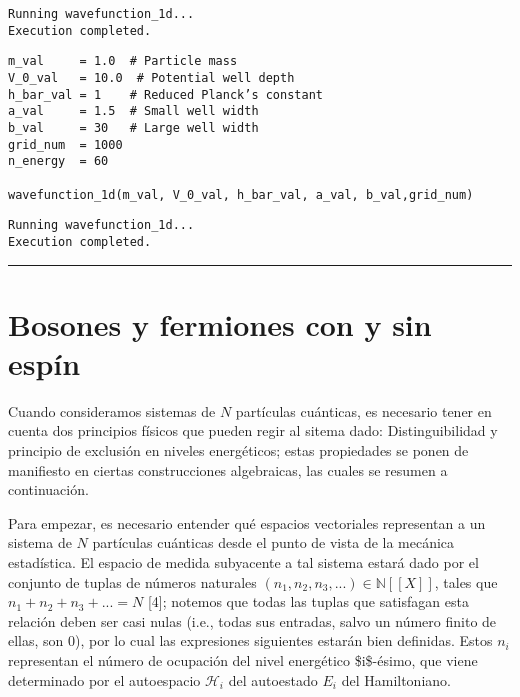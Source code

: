 \documentclass[11pt]{article}
\begin{document}
\label{orgbdcb23c}
\begin{verbatim}
Running wavefunction_1d...
Execution completed.
\end{verbatim}

\begin{center}

\end{center}
\begin{center}

\end{center}

\begin{verbatim}
m_val     = 1.0  # Particle mass
V_0_val   = 10.0  # Potential well depth
h_bar_val = 1    # Reduced Planck’s constant
a_val     = 1.5  # Small well width
b_val     = 30   # Large well width
grid_num  = 1000
n_energy  = 60

wavefunction_1d(m_val, V_0_val, h_bar_val, a_val, b_val,grid_num)
\end{verbatim}

\label{org7ef58a2}
\begin{verbatim}
Running wavefunction_1d...
Execution completed.
\end{verbatim}

\begin{center}

\end{center}
\begin{center}

\end{center}

\noindent\rule{\textwidth}{0.5pt}
\section{Bosones y fermiones con y sin espín}
\label{sec:orgb01af17}

Cuando consideramos sistemas de \(N\) partículas cuánticas, es necesario tener
en cuenta dos principios físicos que pueden regir al sitema dado:
Distinguibilidad y principio de exclusión en niveles energéticos; estas
propiedades se ponen de manifiesto en ciertas construcciones algebraicas, las
cuales se resumen a continuación.

Para empezar, es necesario entender qué espacios vectoriales representan a un
sistema de \(N\) partículas cuánticas desde el punto de vista de la mecánica
estadística. El espacio de medida subyacente a tal sistema estará dado por el
conjunto de tuplas de números naturales \((n_1, n_2, n_3, ...) \in
\mathbb{N}[\![X]\!]\), tales que \(n_1 + n_2 + n_3 + ... = N\) {[}4];
notemos que todas las tuplas que satisfagan esta relación deben ser casi nulas (i.e., todas
sus entradas, salvo un número finito de ellas, son 0), por lo cual las
expresiones siguientes estarán bien definidas. Estos \(n_i\) representan el
número de ocupación del nivel energético \$i\$-ésimo, que viene determinado por
el autoespacio \(\mathcal{H}_i\) del autoestado \(E_i\) del Hamiltoniano.
\end{document}
